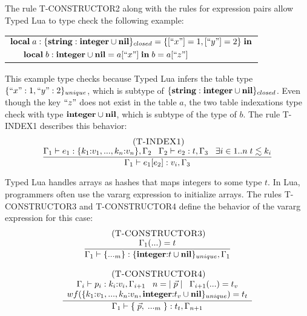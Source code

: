 The rule \textsc{T-CONSTRUCTOR2} along with the rules for expression
pairs allow Typed Lua to type check the following example:
\begin{center}
\begin{tabular}{ll}
\multicolumn{2}{l}{$\mathbf{local} \; a:\{\mathbf{string}:\mathbf{integer} \cup \mathbf{nil}\}_{closed} = \{ [``x"] = 1, [``y"] = 2 \} \; \mathbf{in}$}\\
& \multicolumn{1}{l}{$\mathbf{local} \; b:\mathbf{integer} \cup \mathbf{nil} = a[``x"] \; \mathbf{in} \; b = a[``z"]$}
\end{tabular}
\end{center}

This example type checks because Typed Lua infers the table type
$\{``x":1, ``y":2\}_{unique}$, which is subtype of
$\{\mathbf{string}:\mathbf{integer} \cup \mathbf{nil}\}_{closed}$.
Even though the key $``z"$ does not exist in the table $a$,
the two table indexations type check with type $\mathbf{integer} \cup \mathbf{nil}$,
which is subtype of the type of $b$.
The rule \textsc{T-INDEX1} describes this behavior:
\[
\begin{array}{c}
\; (\textsc{T-INDEX1})\\
\dfrac{\Gamma_{1} \vdash e_{1}:\{k_{1}{:}v_{1}, ..., k_{n}{:}v_{n}\}, \Gamma_{2} \;\;\;
       \Gamma_{2} \vdash e_{2}:t, \Gamma_{3} \;\;\;
       \exists i \in 1{..}n \; t \lesssim k_{i}}
      {\Gamma_{1} \vdash e_{1}[e_{2}]:v_{i}, \Gamma_{3}}
\end{array}
\]

Typed Lua handles arrays as hashes that maps integers to some type $t$.
In Lua, programmers often use the vararg expression to initialize arrays.
The rules \textsc{T-CONSTRUCTOR3} and \textsc{T-CONSTRUCTOR4} define
the behavior of the vararg expression for this case:
\[
\begin{array}{c}
\begin{array}{c}
\; (\textsc{T-CONSTRUCTOR3})\\
\dfrac{\Gamma_{1}({...}) = t}
      {\Gamma_{1} \vdash \{{...}_{m}\}:\{\mathbf{integer}{:}t \cup \mathbf{nil}\}_{unique}, \Gamma_{1}}
\end{array}
\\ \\
\begin{array}{c}
\; (\textsc{T-CONSTRUCTOR4})\\
\dfrac{\begin{array}{c}
       \Gamma_{i} \vdash p_{i}:k_{i}{:}v_{i}, \Gamma_{i+1} \;\;\;
       n = |\;\vec{p}\;| \;\;\;
       \Gamma_{i+1}({...}) = t_{v}\\
       wf(\{k_{1}{:}v_{1}, ..., k_{n}{:}v_{n}, \mathbf{integer}{:}t_{v} \cup \mathbf{nil}\}_{unique}) = t_{t}
       \end{array}}
      {\Gamma_{1} \vdash \{\;\vec{p},\;{...}_{m}\;\}:t_{t}, \Gamma_{n+1}}
\end{array}
\end{array}
\]

